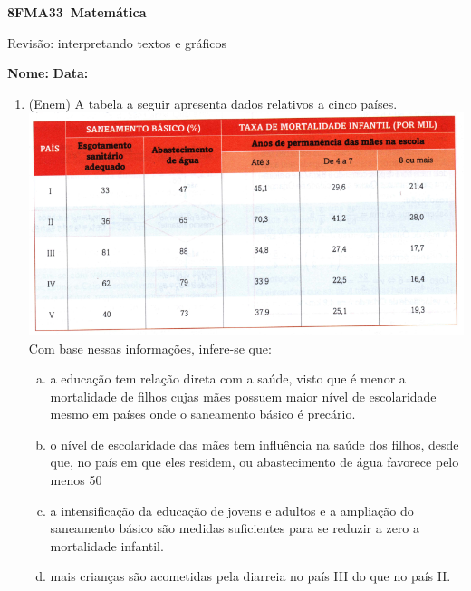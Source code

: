 \documentclass[a4paper,14pt]{article}
\begin{document}
	
	\noindent\textbf{8FMA33~Matemática} 
	
	\begin{center}Revisão: interpretando textos e gráficos
	\end{center}
	
	\noindent\textbf{Nome:} \underline{\hspace{10cm}}
	\noindent\textbf{Data:} \underline{\hspace{4cm}}
	
	
	\begin{enumerate}
		
		\item (Enem) A tabela a seguir apresenta dados relativos a cinco países.\\
		\includegraphics[width=1\linewidth]{8FMA33_imagens/imagem1}\\
		Com base nessas informações, infere-se que:
		\begin{enumerate}[a)]	
			\item a educação tem relação direta com a saúde, visto que é menor a mortalidade de filhos cujas mães possuem maior nível de escolaridade mesmo em países onde o saneamento básico é precário.
			\item o nível de escolaridade das mães tem influência na saúde dos filhos, desde que, no país em que eles residem, ou abastecimento de água favorece pelo menos 50%
			\item a intensificação da educação de jovens e adultos e a ampliação do saneamento básico são medidas suficientes para se reduzir a zero a mortalidade infantil.
			\item mais crianças são acometidas pela diarreia no país III do que no país II.

\end{enumerate}
\end{enumerate}
\end{document}
